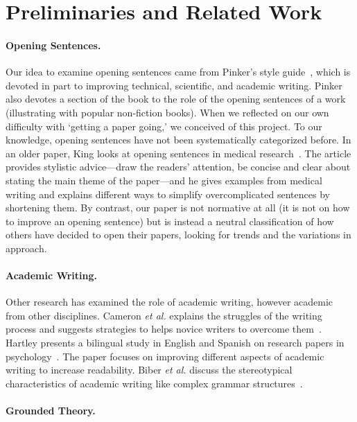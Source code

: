 \documentclass[sigconf,anonymous]{acmart}
\newcommand{\etal}{\textit{et al.}\xspace}
\begin{document}
	
\section{Preliminaries and Related Work}
	
\paragraph{Opening Sentences.}

Our idea to examine opening sentences came from Pinker's style guide~\cite{Pin15}, which is devoted in part to improving technical, scientific, and academic writing. Pinker also devotes a section of the book to the role of the opening sentences of a work (illustrating with popular non-fiction books). When we reflected on our own difficulty with `getting a paper going,' we conceived of this project. To our knowledge, opening sentences have not been systematically categorized before. In an older paper, King looks at opening sentences in medical research~\cite{king1967opening}. The article provides stylistic advice---draw the readers' attention, be concise and clear about stating the main theme of the paper---and he gives examples from medical writing and explains different ways to simplify overcomplicated sentences by shortening them. By contrast, our paper is not normative at all (it is not on how to improve an opening sentence) but is instead a neutral classification of how others have decided to open their papers, looking for trends and the variations in approach. 

\paragraph{Academic Writing.}  Other research has examined the role of academic writing, however academic from other disciplines. Cameron \etal explains the struggles of the writing process and suggests strategies to helps novice writers to overcome them~\cite{cameron2009demystifying}. Hartley presents a bilingual study in English and Spanish on research papers in psychology~\cite{hartley2012new}. The paper focuses on improving different aspects of academic writing to increase readability. Biber \etal discuss the stereotypical characteristics of academic writing like complex grammar structures~\cite{biber2010challenging}.   
	
	
\paragraph{Grounded Theory.}
	
\end{document}
